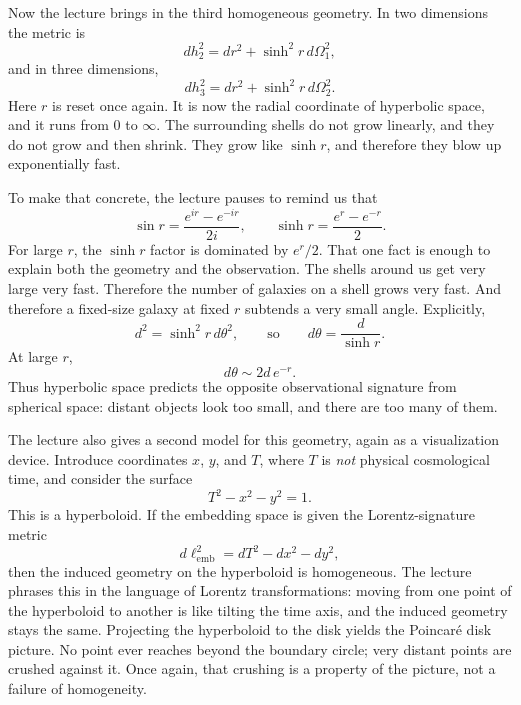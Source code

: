 Now the lecture brings in the third homogeneous geometry. In two dimensions the metric is
\begin{equation}
dh_2^2 = dr^2 + \sinh^2 r\, d\Omega_1^2,
\end{equation}
and in three dimensions,
\begin{equation}
dh_3^2 = dr^2 + \sinh^2 r\, d\Omega_2^2.
\end{equation}
Here \(r\) is reset once again. It is now the radial coordinate of hyperbolic space, and it runs from \(0\) to \(\infty\). The surrounding shells do not grow linearly, and they do not grow and then shrink. They grow like \(\sinh r\), and therefore they blow up exponentially fast.

To make that concrete, the lecture pauses to remind us that
\begin{equation}
\sin r = \frac{e^{ir}-e^{-ir}}{2i},
\qquad
\sinh r = \frac{e^r-e^{-r}}{2}.
\end{equation}
For large \(r\), the \(\sinh r\) factor is dominated by \(e^r/2\). That one fact is enough to explain both the geometry and the observation. The shells around us get very large very fast. Therefore the number of galaxies on a shell grows very fast. And therefore a fixed-size galaxy at fixed \(r\) subtends a very small angle. Explicitly,
\begin{equation}
d^2 = \sinh^2 r\, d\theta^2,
\qquad\text{so}\qquad
d\theta = \frac{d}{\sinh r}.
\end{equation}
At large \(r\),
\begin{equation}
d\theta \sim 2d\,e^{-r}.
\end{equation}
Thus hyperbolic space predicts the opposite observational signature from spherical space: distant objects look too small, and there are too many of them.

The lecture also gives a second model for this geometry, again as a visualization device. Introduce coordinates \(x\), \(y\), and \(T\), where \(T\) is \emph{not} physical cosmological time, and consider the surface
\begin{equation}
T^2 - x^2 - y^2 = 1.
\end{equation}
This is a hyperboloid. If the embedding space is given the Lorentz-signature metric
\begin{equation}
d\ell_{\mathrm{emb}}^2 = dT^2 - dx^2 - dy^2,
\end{equation}
then the induced geometry on the hyperboloid is homogeneous. The lecture phrases this in the language of Lorentz transformations: moving from one point of the hyperboloid to another is like tilting the time axis, and the induced geometry stays the same. Projecting the hyperboloid to the disk yields the Poincar\'e disk picture. No point ever reaches beyond the boundary circle; very distant points are crushed against it. Once again, that crushing is a property of the picture, not a failure of homogeneity.

